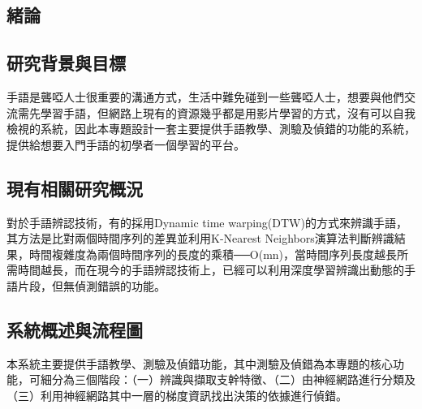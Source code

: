 \documentclass[12pt,a4paper]{report}
\begin{document}
\begin{CJK*}{UTF8}{bkai}


    \newpage


    \chapter{緒論}


    \section{研究背景與目標}
    \par
    手語是聾啞人士很重要的溝通方式，生活中難免碰到一些聾啞人士，想要與他們交流需先學習手語，但網路上現有的資源幾乎都是用影片學習的方式，沒有可以自我檢視的系統，因此本專題設計一套主要提供手語教學、測驗及偵錯的功能的系統，提供給想要入門手語的初學者一個學習的平台。

    \section{現有相關研究概況}
    \par
    對於手語辨認技術，有的採用Dynamic time warping(DTW)的方式來辨識手語，其方法是比對兩個時間序列的差異並利用K-Nearest Neighbors演算法判斷辨識結果，時間複雜度為兩個時間序列的長度的乘積──O(mn)，當時間序列長度越長所需時間越長，而在現今的手語辨認技術上，已經可以利用深度學習辨識出動態的手語片段，但無偵測錯誤的功能。
    \par

    \section{系統概述與流程圖}
    \par
    本系統主要提供手語教學、測驗及偵錯功能，其中測驗及偵錯為本專題的核心功能，可細分為三個階段：（一）辨識與擷取支幹特徵、（二）由神經網路進行分類及（三）利用神經網路其中一層的梯度資訊找出決策的依據進行偵錯。


\end{CJK*}
\end{document}
